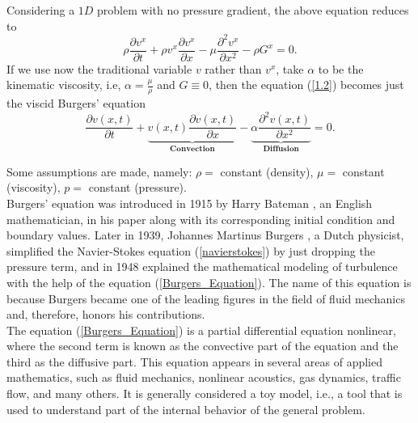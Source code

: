     \noindent Considering a $1D$ problem with no pressure gradient, the above equation reduces to\\
    \begin{equation}
        \rho \frac{\partial v^x}{\partial t} + \rho v^x \frac{\partial v^x}{\partial x} - \mu \frac{\partial^2 v^x}{\partial x^2} - \rho G^x = 0.
        \label{1.2}
    \end{equation}
    If we use now the traditional variable $v$ rather than $v^x$, take $\alpha$ to be the kinematic viscosity, i.e, $\alpha = \frac{\mu}{\rho}$ and $G \equiv 0$, then the equation (\ref{1.2}) becomes just the viscid Burgers' equation
    \begin{equation}
    \label{Burgers_Equation}
        \frac{\partial v(x, t)}{\partial t} +  \underbrace{v(x, t) \frac{\partial v(x, t)}{\partial x}}_{\textbf{Convection}} - \underbrace{\alpha \frac{\partial^2 v(x, t)}{\partial x^2}}_{\textbf{Diffusion}} = 0.
    \end{equation}

    Some assumptions  are  made,  namely: $\rho =$ constant (density), $\mu =$ constant  (viscosity),  $p=$ constant (pressure). \\
    
    Burgers' equation was introduced in 1915 by Harry Bateman \cite{Bateman1915}, an English mathematician, in his paper along with its corresponding initial condition and boundary values. Later in 1939, Johannes Martinus Burgers \cite{Burgers1939,Burgers1948}, a Dutch physicist, simplified the Navier-Stokes equation (\ref{navierstokes}) by just dropping the pressure term, and in 1948 explained the  mathematical modeling of turbulence with the help of the equation (\ref{Burgers_Equation}). The name of this equation is because Burgers became one of the leading figures in the field of fluid mechanics and, therefore, honors his contributions. \\  
    
    The equation (\ref{Burgers_Equation}) is a partial differential equation nonlinear, where the second term is known as the convective part of the equation and the third as the diffusive part. This equation appears in several areas of applied mathematics, such as fluid mechanics, nonlinear acoustics, gas dynamics, traffic flow, and many others. It is generally considered a toy model, i.e., a tool that is used to understand part of the internal behavior of the general problem.  \\
    
